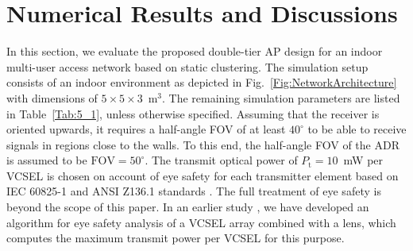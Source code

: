 \documentclass[lettersize,journal]{IEEEtran}
\begin{document}
\section{Numerical Results and Discussions} \label{NumericalResults}
In this section, we evaluate the proposed double-tier \ac{AP} design for an indoor multi-user access network based on static clustering. The simulation setup consists of an indoor environment as depicted in Fig.~\ref{Fig:NetworkArchitecture} with dimensions of $5 \times 5 \times 3$~m$^3$. The remaining simulation parameters are listed in Table~\ref{Tab:5_1}, unless otherwise specified. Assuming that the receiver is oriented upwards, it requires a half-angle \ac{FOV} of at least $40^\circ$ to be able to receive signals in regions close to the walls. To this end, the half-angle \ac{FOV} of the \ac{ADR} is assumed to be $\mathrm{FOV} = 50^\circ$. The transmit optical power of $P_\mathrm{t}=10$~mW per \ac{VCSEL} is chosen on account of eye safety for each transmitter element based on \ac{IEC} 60825-1 and \ac{ANSI} Z136.1 standards \cite{IEC_Std608251,ANSI-Z136.4,Henderson2003}. The full treatment of eye safety is beyond the scope of this paper. In an earlier study \cite{HKazemi2023MultiBeam}, we have developed an algorithm for eye safety analysis of a \ac{VCSEL} array combined with a lens, which computes the maximum transmit power per \ac{VCSEL} for this purpose.

\vspace{-8pt}
\end{document}
